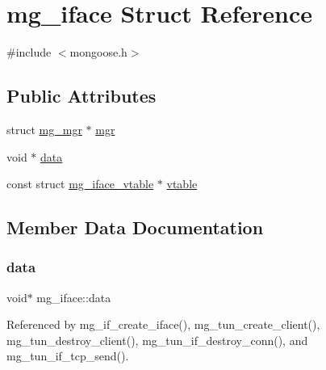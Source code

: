 \hypertarget{structmg__iface}{}\section{mg\+\_\+iface Struct Reference}
\label{structmg__iface}


{\ttfamily \#include $<$mongoose.\+h$>$}

\subsection*{Public Attributes}
\begin{DoxyCompactItemize}
\item 
struct \hyperlink{structmg__mgr}{mg\+\_\+mgr} $\ast$ \hyperlink{structmg__iface_ad25f7c336d2f8f9ae7505412e9c17fc2_ad25f7c336d2f8f9ae7505412e9c17fc2}{mgr}
\item 
void $\ast$ \hyperlink{structmg__iface_a43da8e59cadad694395f2a55df5c32a8_a43da8e59cadad694395f2a55df5c32a8}{data}
\item 
const struct \hyperlink{structmg__iface__vtable}{mg\+\_\+iface\+\_\+vtable} $\ast$ \hyperlink{structmg__iface_ae02adab992b9704f4e61e937c505f336_ae02adab992b9704f4e61e937c505f336}{vtable}
\end{DoxyCompactItemize}


\subsection{Member Data Documentation}
\mbox{\label{structmg__iface_a43da8e59cadad694395f2a55df5c32a8_a43da8e59cadad694395f2a55df5c32a8}} 
\subsubsection{\texorpdfstring{data}{data}}
{\footnotesize\ttfamily void$\ast$ mg\+\_\+iface\+::data}



Referenced by mg\+\_\+if\+\_\+create\+\_\+iface(), mg\+\_\+tun\+\_\+create\+\_\+client(), mg\+\_\+tun\+\_\+destroy\+\_\+client(), mg\+\_\+tun\+\_\+if\+\_\+destroy\+\_\+conn(), and mg\+\_\+tun\+\_\+if\+\_\+tcp\+\_\+send().

\mbox{\label{structmg__iface_ad25f7c336d2f8f9ae7505412e9c17fc2_ad25f7c336d2f8f9ae7505412e9c17fc2}} 
